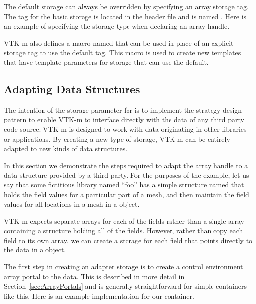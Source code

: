 The default storage can always be overridden by specifying an array
storage tag. The tag for the basic storage is located in the
 header file and is named
. Here is an example of specifying
the storage type when declaring an array handle.


VTK-m also defines a macro named 
that can be used in place of an explicit storage tag to use the
default tag. This macro is used to create new templates that have template
parameters for storage that can use the default.

\subsection{Adapting Data Structures}
\label{sec:ArrayHandle:Adapting}


The intention of the storage parameter for  is to
implement the strategy design pattern to enable VTK-m to interface directly
with the data of any third party code source. VTK-m is designed to work
with data originating in other libraries or applications. By creating a new
type of storage, VTK-m can be entirely adapted to new kinds of data
structures.

In this section we demonstrate the steps required to adapt the array handle
to a data structure provided by a third party. For the purposes of the
example, let us say that some fictitious library named ``foo'' has a simple
structure named  that holds the field values for a
particular part of a mesh, and then maintain the field values for all
locations in a mesh in a  object.


VTK-m expects separate arrays for each of the fields rather than a single
array containing a structure holding all of the fields. However, rather
than copy each field to its own array, we can create a storage for each
field that points directly to the data in a 
object.

The first step in creating an adapter storage is to create a control
environment array portal to the data. This is described in more detail in
Section~\ref{sec:ArrayPortals} and is generally straightforward for simple
containers like this. Here is an example implementation for our
 container.

